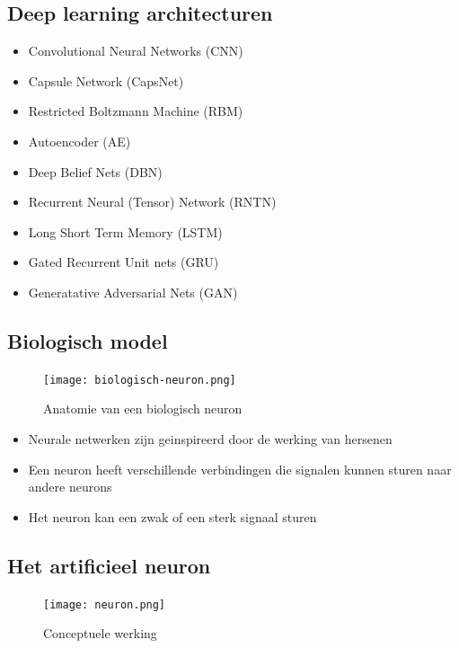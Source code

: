 \documentclass{article}
\begin{document}
\subsection{Deep learning architecturen}

\begin{itemize}
    \item Convolutional Neural Networks (CNN)
    \item Capsule Network (CapsNet)
    \item Restricted Boltzmann Machine (RBM)
    \item Autoencoder (AE)
    \item Deep Belief Nets (DBN)
    \item Recurrent Neural (Tensor) Network (RNTN)
    \item Long Short Term Memory (LSTM)
    \item Gated Recurrent Unit nets (GRU)
    \item Generatative Adversarial Nets (GAN)
\end{itemize}

\subsection{Biologisch model}

\begin{figure}[H]
    \centering
    \texttt{[image: biologisch-neuron.png]}
    \caption{Anatomie van een biologisch neuron}
\end{figure}

\begin{itemize}
    \item Neurale netwerken zijn geinspireerd door de werking van hersenen
    \item Een neuron heeft verschillende verbindingen die signalen kunnen sturen naar andere neurons
    \item Het neuron kan een zwak of een sterk signaal sturen
\end{itemize}

\subsection{Het artificieel neuron}

\begin{figure}[H]
    \centering
    \texttt{[image: neuron.png]}
    \caption{Conceptuele werking}
\end{figure}
\end{document}
